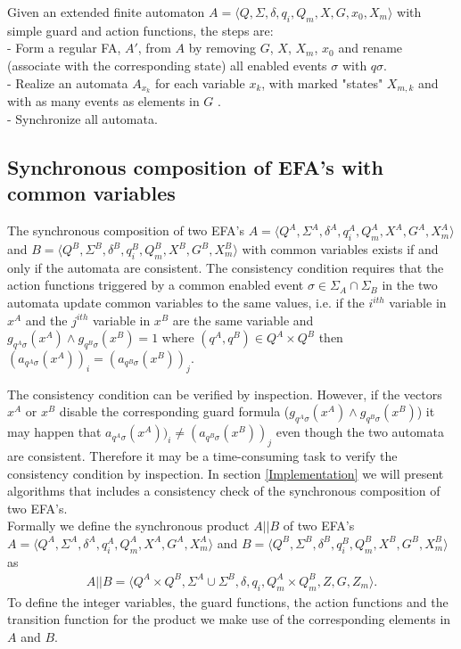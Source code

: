 \documentclass{article}
\begin{document}
Given an extended finite automaton $A=\langle Q, \Sigma, \delta,
q_i, Q_m, X, G ,x_0, X_m \rangle$ with simple guard and action
functions, the steps are:\\
- Form a regular FA, $A'$, from $A$ by removing $G$, $X$, $X_m$,
$x_0$ and rename (associate with the corresponding state) all
enabled events $\sigma$ with $q\sigma$.\\
- Realize an automata $A_{x_k}$ for each variable $x_k$, with marked "states" $X_{m,k}$ and with as many events as elements in $G$ .\\
- Synchronize all automata.
\newpage
\subsection{Synchronous composition of EFA's with common variables}

The synchronous composition of two EFA's $A=\langle Q^A, \Sigma^A,
\delta^A, q^A_i, Q^A_m, X^{A}, G^A, X^A_m \rangle$ and $B=\langle
Q^B, \Sigma^B, \delta^B, q^B_i, Q^B_m, X^{B}, G^B, X^B_m \rangle$
with common variables exists if and only if the automata are
consistent. The consistency condition requires that the action
functions triggered by a common enabled event $\sigma\in
\Sigma_{A}\cap \Sigma_{B}$ in the two automata update common
variables to the same values, i.e. if the $i^{ith}$ variable in
$x^{A}$ and the $j^{ith}$ variable in $x^{B}$ are the same
variable and $g_{q^A \sigma}(x^{A})\wedge g_{q^B \sigma}(x^{B})=1$
where $(q^A,q^B)\in Q^A\times Q^B$ then $(a_{q^A \sigma}(x^{A}))_i
= (a_{q^B \sigma}(x^{B}))_j$.

The consistency condition can be verified by inspection. However,
if the vectors $x^{A}$ or $x^{B}$ disable the corresponding guard
formula ($g_{q^A \sigma}(x^{A})\wedge g_{q^B \sigma}(x^{B})$) it
may happen that $a_{q^A \sigma}(x^{A}))_i \neq (a_{q^B
\sigma}(x^{B}))_j$ even though the two automata are consistent.
Therefore it may be a time-consuming task to verify the
consistency condition by inspection. In section
\ref{Implementation} we will present algorithms that includes a
consistency check of the synchronous
composition of two EFA's. \\

Formally we define the synchronous product $A||B$ of two EFA's
$A=\langle Q^A, \Sigma^A, \delta^A, q^A_i, Q^A_m, X^{A}, G^A,X^A_m
\rangle$ and $B=\langle Q^B, \Sigma^B, \delta^B, q^B_i, Q^B_m,
X^{B}, G^B,X^B_m
 \rangle$ as
\begin{eqnarray}
A||B=\langle Q^A\times Q^B, \Sigma^A \cup \Sigma^B , \delta, q_i,
Q^A_m\times Q^B_m, Z, G, Z_m \rangle.
\end{eqnarray}
To define the integer variables, the guard functions, the action
functions and the transition function for the product we make use
of the corresponding elements in $A$ and $B$.
\end{document}
